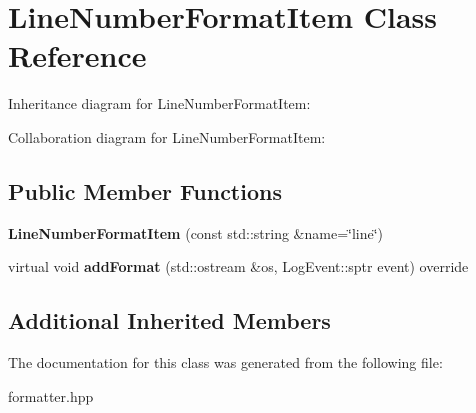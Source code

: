 \hypertarget{classLineNumberFormatItem}{}\section{Line\+Number\+Format\+Item Class Reference}
\label{classLineNumberFormatItem}


Inheritance diagram for Line\+Number\+Format\+Item\+:


Collaboration diagram for Line\+Number\+Format\+Item\+:
\subsection*{Public Member Functions}
\begin{DoxyCompactItemize}
\item 
\mbox{\label{classLineNumberFormatItem_a60b55d2f5bf7e67a1e0e585ecaaff00b}} 
{\bfseries Line\+Number\+Format\+Item} (const std\+::string \&name=\char`\"{}line\char`\"{})
\item 
\mbox{\label{classLineNumberFormatItem_a26a2986f1edca82799f5297a65a96a0e}} 
virtual void {\bfseries add\+Format} (std\+::ostream \&os, Log\+Event\+::sptr event) override
\end{DoxyCompactItemize}
\subsection*{Additional Inherited Members}


The documentation for this class was generated from the following file\+:\begin{DoxyCompactItemize}
\item 
formatter.\+hpp\end{DoxyCompactItemize}
